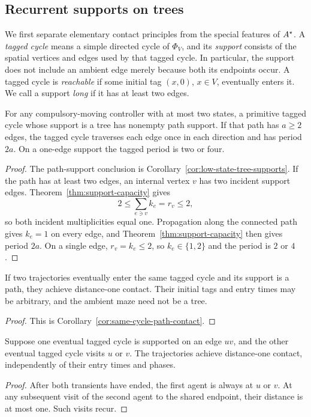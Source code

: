 \subsection{Recurrent supports on trees}\label{sec:tree-lower}

We first separate elementary contact principles from the special features of
\(A^{\star}\). A \emph{tagged cycle} means a simple directed cycle of
\(\Phi_V\), and its \emph{support} consists of the spatial vertices and edges
used by that tagged cycle. In particular, the support does not include an
ambient edge merely because both its endpoints occur. A tagged cycle is
\emph{reachable} if some initial tag \((x,0)\), \(x\in V\), eventually enters it.
We call a support \emph{long} if it has at least two edges.

\begin{lemma}\label{t:path-support}
For any compulsory-moving controller with at most two states, a primitive tagged cycle whose support is a tree has nonempty path support.  If that path has $a\ge2$ edges, the tagged cycle traverses each edge once in each direction and has period $2a$.  On a one-edge support the tagged period is two or four.
\end{lemma}
\begin{proof}
The path-support conclusion is Corollary~\ref{cor:low-state-tree-supports}.  If the path has at least two edges, an internal vertex $v$ has two incident support edges.  Theorem~\ref{thm:support-capacity} gives
\[
 2\le \sum_{e\ni v}k_e=r_v\le2,
\]
so both incident multiplicities equal one.  Propagation along the connected path gives $k_e=1$ on every edge, and Theorem~\ref{thm:support-capacity} then gives period $2a$.  On a single edge, $r_v=k_e\le2$, so $k_e\in\{1,2\}$ and the period is $2$ or $4$.
\end{proof}

\begin{lemma}\label{t:same-cycle}
If two trajectories eventually enter the same tagged cycle and its support is a path, they achieve distance-one contact.  Their initial tags and entry times may be arbitrary, and the ambient maze need not be a tree.
\end{lemma}
\begin{proof}
This is Corollary~\ref{cor:same-cycle-path-contact}.
\end{proof}

\begin{lemma}\label{t:edge-contact}
Suppose one eventual tagged cycle is supported on an edge \(uv\), and the
other eventual tagged cycle visits \(u\) or \(v\). The trajectories achieve
distance-one contact, independently of their entry times and phases.
\end{lemma}
\begin{proof}
After both transients have ended, the first agent is always at \(u\) or
\(v\). At any subsequent visit of the second agent to the shared endpoint,
their distance is at most one. Such visits recur.
\end{proof}

